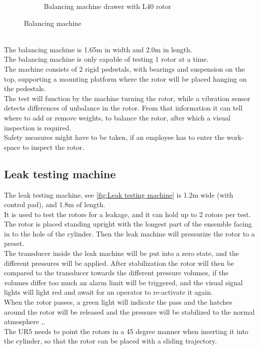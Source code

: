 \begin{figure}[H]
\begin{subfigure}{.49\textwidth}
        \caption{Balancing machine drawer with L40 rotor}
        \label{fig:Rotor} 
    \end{subfigure}
\caption{Balancing machine\cite{Case}}
\label{fig:BalancingMachine}
\end{figure}
\\
The balancing machine is 1.65m in width and 2.0m in length.\\
The balancing machine is only capable of testing 1 rotor at a time.\\
The machine consists of 2 rigid pedestals, with bearings and suspension on the top, supporting a mounting platform where the rotor will be placed hanging on the pedestals.\\
The test will function by the machine turning the rotor, while a vibration sensor detects differences of unbalance in the rotor. From that information it can tell where to add or remove weights, to balance the rotor, after which a visual inspection is required. \\
Safety measures might have to be taken, if an employee has to enter the work-space to inspect the rotor. \\

 \subsection{Leak testing machine}
 
 The leak testing machine, see \ref{fig:Leak testing machine} is 1.2m wide (with control pad), and 1.8m of length.\\ 
 It is used to test the rotors for a leakage, and it can hold up to 2 rotors per test.\\
 The rotor is placed standing upright with the longest part of the ensemble facing in to the hole of the cylinder. Then the leak machine will pressurize the rotor to a preset.\\
 The transducer inside the leak machine will be put into a zero state, and the different pressures will be applied. After stabilization the rotor will then be compared to the transducer towards the different pressure volumes, if the volumes differ too much an alarm limit will be triggered, and the visual signal lights will light red and await for an operator to re-activate it again. \\
 When the rotor passes, a green light will indicate the pass and the hatches around the rotor will be released and the pressure will be stabilized to the normal atmosphere  \cite{LEAK},\cite{LEAK2}. \\
 The UR5 needs to point the rotors in a 45 degree manner when inserting it into the cylinder, so that the rotor can be placed with a sliding trajectory. \\
 

